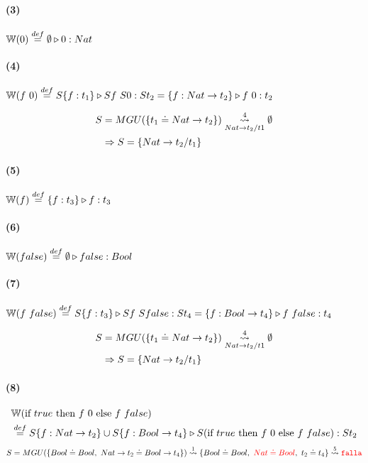 \documentclass[10pt,a4paper]{article}
\begin{document}
\paragraph{(3)} $\WFunc(0) \equalDef \judgeType{\emptyset}{0}{Nat}$

\paragraph{(4)} $\WFunc(f~0) \equalDef \judgeType{S\{f:t_1\}}{Sf~S0}{St_2} = \judgeType{\{f:Nat\to t_2\}}{f~0}{t_2}$

\begin{centrado}
\begin{align*}
S &= MGU(\{t_1\doteq Nat \to t_2\}) \goesTo{4}{Nat\to t_2/t1}  \emptyset \\
&\Rightarrow S=\{Nat\to t_2/t_1\}
\end{align*}
\end{centrado}

\vspace*{5mm}
\begin{multicols}{2}
\paragraph{(5)} $\WFunc(f) \equalDef \judgeType{\{f:t_3\}}{f}{t_3}$

\paragraph{(6)} $\WFunc(false) \equalDef \judgeType{\emptyset}{false}{Bool}$
\end{multicols}


\paragraph{(7)} $\WFunc(f~false) \equalDef \judgeType{S\{f:t_3\}}{Sf~Sfalse}{St_4} = \judgeType{\{f:Bool\to t_4\}}{f~false}{t_4}$

\begin{centrado}
\begin{align*}
S &= MGU(\{t_1\doteq Nat \to t_2\}) \goesTo{4}{Nat\to t_2/t1}  \emptyset \\
&\Rightarrow S=\{Nat\to t_2/t_1\}
\end{align*}
\end{centrado}



\paragraph{(8)} 
\begin{align*}
&\WFunc(\lambdaIf{true}{f~0}{f~false}) \\
&\equalDef \judgeType{S\{f:Nat\to t_2\} \cup S\{f:Bool\to t_4\}}{S(\lambdaIf{true}{f~0}{f~false})}{St_2} \\
\end{align*}
\begin{align*}
S &= MGU(\{Bool\doteq Bool,~Nat\to t_2 \doteq Bool \to t_4\}) \goesTo{1}{} \{Bool\doteq Bool,~\red{Nat \doteq Bool},~t_2 \doteq t_4\} \goesTo{5}{} \falla\\
\end{align*}
\end{document}

